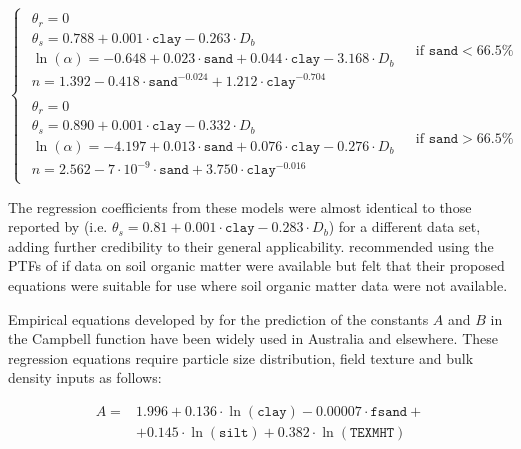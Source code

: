 \documentclass[graybox,natbib,nospthms,UStrade]{svmono}
\begin{document}
\begin{equation}
\begin{cases}
 \begin{matrix}
 \theta_r  = 0 \\
 \theta_s  = 0.788 + 0.001 \cdot {\mathtt{clay}} -0.263 \cdot D_b \\
 \ln(\alpha) = -0.648 + 0.023 \cdot {\mathtt{sand}} + 0.044 \cdot {\mathtt{clay}} -3.168 \cdot D_b \\
 n = 1.392- 0.418\cdot {\mathtt{sand}}^{-0.024} + 1.212\cdot {\mathtt{clay}}^{-0.704}
\end{matrix} & \text{ if } {\mathtt{sand}} < 66.5\% \\ \hline \begin{matrix}
 \theta_r  = 0 \\
 \theta_s  = 0.890 + 0.001 \cdot {\mathtt{clay}} -0.332 \cdot D_b \\
 \ln(\alpha) = -4.197 + 0.013 \cdot {\mathtt{sand}} + 0.076 \cdot {\mathtt{clay}} -0.276 \cdot D_b \\
 n = 2.562 - 7 \cdot 10^{-9} \cdot {\mathtt{sand}} + 3.750\cdot {\mathtt{clay}}^{-0.016}
\end{matrix} & \text{ if } {\mathtt{sand}} > 66.5\%
\end{cases}
\label{eq:thetas}
\end{equation}

The regression coefficients from these models were almost identical to
those reported by \citet{Vereecken1989SS} (i.e.
\(\theta_s = 0.81 + 0.001 \cdot {\mathtt{clay}} - 0.283 \cdot D_b\)) for
a different data set, adding further credibility to their general
applicability. \citet{Zacharias2007SSSAJ} recommended using the PTFs of
\citet{Vereecken1989SS} if data on soil organic matter were available but felt
that their proposed equations were suitable for use where soil organic
matter data were not available.

Empirical equations developed by \citet{Williams1992} for the prediction of the
constants \(A\) and \(B\) in the Campbell function have been widely used in
Australia and elsewhere. These regression equations require particle
size distribution, field texture and bulk density inputs as follows:

\begin{equation}
\begin{split}   
A =& 1.996 + 0.136 \cdot \ln({\mathtt{clay}}) - 0.00007 \cdot {\mathtt{fsand}} + \\
  & + 0.145\cdot \ln({\mathtt{silt}}) + 0.382 \cdot \ln({\mathtt{TEXMHT}})
\end{split}
\end{equation}
\end{document}
